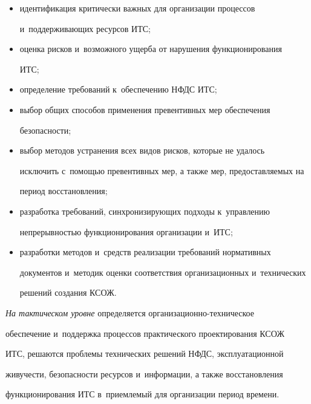   \begin{itemize}


  \item идентификация критически важных для организации процессов 


и~поддерживающих ресурсов ИТС;


  \item оценка рисков и~возможного ущерба от нарушения функционирования 


ИТС;


  \item определение требований к~обеспечению НФДС ИТС;


  \item выбор общих способов применения превентивных мер обеспечения 


безопасности;


  \item выбор методов устранения всех видов рисков, которые не удалось 


исключить с~помощью превентивных мер, а также мер, предоставляемых на 


период восстановления;


  \item разработка требований, синхронизирующих подходы к~управлению 


непрерывностью функционирования организации и~ИТС;


  \item разработки методов и~средств реализации требований нормативных 


документов и~методик оценки соответствия организационных и~технических 


решений создания КСОЖ.


  \end{itemize}


  


  \textit{На тактическом уровне} определяется организационно-техническое 


обеспечение и~поддержка процессов практического проектирования КСОЖ 


ИТС, решаются проблемы технических решений НФДС, эксплуатационной 


живучести, безопасности ресурсов и~информации, а также восстановления 


функционирования ИТС в~приемлемый для организации период времени.


  


